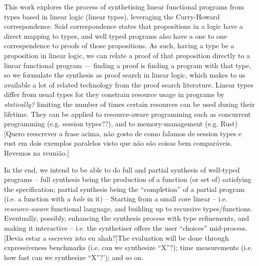 \documentclass{llncs}
\begin{document}
This work explores the process of synthetising linear functional
programs from types based in linear logic (linear types), leveraging
the Curry-Howard correspondence.  Said correspondence states that
propositions in a logic have a direct mapping to types, and well typed
programs also have a one to one correspendence to proofs of those
propositions.  As such, having a type be a proposition in linear
logic, we can relate a proof of that proposition directly to a linear
functional program — finding a proof is finding a program with that
type, so we formulate the synthesis as proof search in linear logic,
which makes to us available a lot of related technology from the proof
search literature.  Linear types differ from usual types for they
constrain resource usage in programs by \emph{statically?} limiting
the number of times certain resources can be used during their
lifetime.  They can be applied to resource-aware programming such as
concurrent programming (e.g. session types??), and to
memory-management (e.g. Rust) [Quero reescrever a frase acima, não
gosto de como falamos de session types e rust em dois exemplos
paralelos visto que não são coisas bem comparáveis. Revemos na
reunião.]
 
In the end, we intend to be able to do full and partial synthesis of
well-typed programs -- full synthesis being the production of a
function (or set of) satisfying the specification; partial synthesis
being the ``completion'' of a partial program (i.e. a function with a
\emph{hole} in it) -- Starting from a small core linear --
i.e. \emph{resource-aware} functional language, and building up to
recursive types/functions.  Eventually, possibly, enhancing the
synthesis process with type refinements, and making it interactive --
i.e. the synthetiser offers the user ``choices'' mid-process.  [Devia
estar a escrever isto eu ahah?]The evaluation will be done through
expressiveness benchmarks (i.e. can we synthesize ``X''?); time
measurements (i.e. how fast can we synthesize ``X''?'); and so on.
\end{document}
